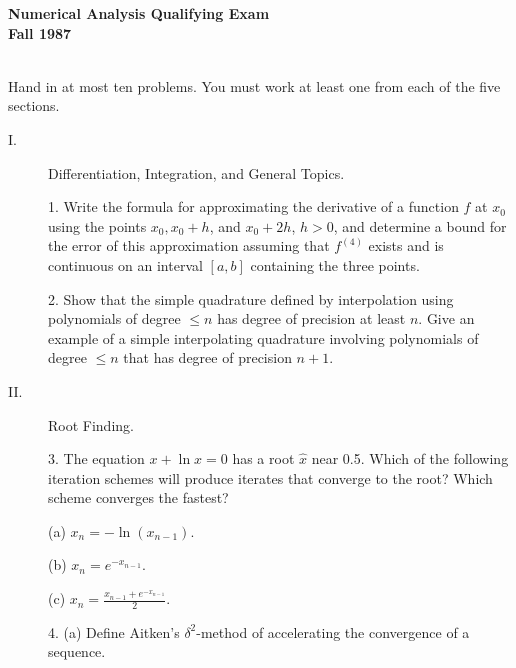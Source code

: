 \documentclass{article}
\begin{document}






\begin{center}\begin{LARGE}
{\bf Numerical Analysis Qualifying Exam}\\ 
{\bf Fall 1987}\\ \end{LARGE}
\end{center}
\vspace{0.1in}
\noindent\hrulefill\\

Hand in at most ten problems. You must work at least one from each
of the five sections.

\begin{description}
\item[I.]
Differentiation, Integration, and General Topics.

\item[\quad] 1.
Write the formula for approximating the derivative of a function $f$ at $x_0$
using the points $x_0, x_0 + h$, and $x_0 + 2h$, $h >0$, and determine a
bound for the error of this approximation assuming that $f^{(4)}$ exists and
is continuous on an interval $[a,b]$ containing the three points.

\item[\quad] 2.
Show that the simple quadrature defined by interpolation using polynomials
of degree $\leq n$ has degree of precision at least $n$. Give an example of
a simple interpolating quadrature involving polynomials of degree $\leq n$
that has degree of precision $n+1$.

\item[II.]
Root Finding.

\item[\quad] 3.
The equation $x+ \ln x = 0$ has a root $\hat x$ near 0.5. Which of the
following iteration schemes will produce iterates that converge to the root?
Which scheme converges the fastest?

\item[\qquad] (a)
$x_n = -\ln (x_{n-1}).$

\item[\qquad] (b)
$x_n = e^{-x_{n-1}}$.

\item[\qquad] (c)
$x_n = \frac{x_{n-1} + e^{-x_{n-1}}}{2}$.

\item[\quad] 4. (a)
Define Aitken's $\delta^2$-method of accelerating the convergence of a
sequence.


\end{description}
\end{document}
